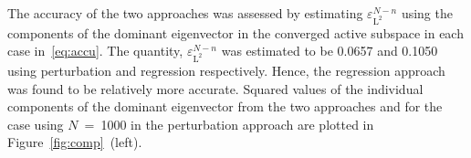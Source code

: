 The accuracy of the two approaches was assessed by estimating $\varepsilon_{\text{L}^{2}}^{N-n}$ 
using the components of the dominant eigenvector in the converged active subspace in each case
in~\eqref{eq:accu}. The quantity, $\varepsilon_{\text{L}^{2}}^{N-n}$ was estimated to be 0.0657
and 0.1050 using perturbation and regression respectively. Hence, the regression approach was
found to be relatively more accurate. Squared values of the individual components of the 
dominant eigenvector from the
two approaches and for the case using $N$~=~1000 in the perturbation approach are plotted in
Figure~\ref{fig:comp}~(left).
%
%
